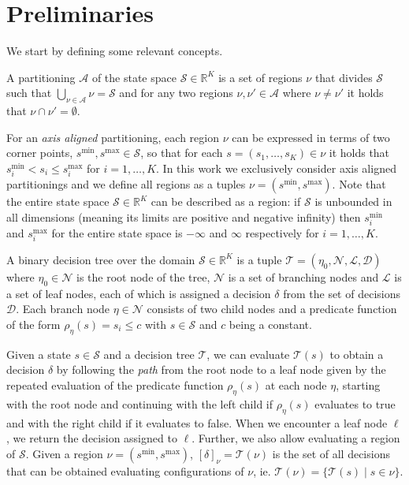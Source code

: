 \section{Preliminaries}%
\label{sec:preliminaries}

We start by defining some relevant concepts.

\begin{definition}[Partitionings]%
\label{def:partitioning}
    A partitioning $\mathcal{A}$ of the state space $\mathcal{S} \in
    \mathbb{R}^K$ is a set of regions $\nu$ that divides $\mathcal{S}$ such that
    $\bigcup_{\nu \in \mathcal{A}}\nu = \mathcal{S}$ and for any two regions
    $\nu, \nu' \in \mathcal{A}$ where $\nu \neq \nu'$ it holds that $\nu \cap
    \nu' = \emptyset$.
\end{definition}

\noindent
For an \textit{axis aligned} partitioning, each region $\nu$ can be expressed in
terms of two corner points, $s^{\min}, s^{\max} \in \mathcal{S}$, so that for
each $s = (s_1, \ldots, s_K) \in \nu$ it holds that $s^{\min}_i < s_i \le
s^{\max}_i$ for $i = 1,\ldots,K$. In this work we exclusively consider axis
aligned partitionings and we define all regions as a tuples $\nu = (s^{\min},
s^{\max})$. Note that the entire state space $\mathcal{S} \in \mathbb{R}^K$ can
be described as a region: if $\mathcal{S}$ is unbounded in all dimensions
(meaning its limits are positive and negative infinity) then $s^{\min}_i$ and
$s^{\max}_i$ for the entire state space is $-\infty$ and $\infty$ respectively
for $i = 1,\ldots,K$.


\begin{definition}%
\label{def:decisionTree}
    A binary decision tree over the domain $\mathcal{S} \in \mathbb{R}^K$ is a
    tuple $\mathcal{T} = (\eta_{0}, \mathcal{N}, \mathcal{L}, \mathcal{D})$
    where $\eta_{0} \in \mathcal{N}$ is the root node of the tree, $\mathcal{N}$
    is a set of branching nodes and $\mathcal{L}$ is a set of leaf nodes, each
    of which is assigned a decision $\delta$ from the set of decisions
    $\mathcal{D}$. Each branch node $\eta \in \mathcal{N}$ consists of two child
    nodes and a predicate function of the form $\rho_{\eta}(s) = s_{i} \leq c$ with $s
    \in \mathcal{S}$ and $c$ being a constant.
\end{definition}

\noindent
Given a state $s \in \mathcal{S}$ and a decision tree $\mathcal{T}$, we can
evaluate $\mathcal{T}(s)$ to obtain a decision $\delta$ by following the
\textit{path} from the root node to a leaf node given by the repeated evaluation
of the predicate function $\rho_{\eta}(s)$ at each node $\eta$, starting with
the root node and continuing with the left child if $\rho_{\eta}(s)$ evaluates
to true and with the right child if it evaluates to false. When we encounter a
leaf node $\ell$, we return the decision assigned to $\ell$. Further, we also
allow evaluating a region of $\mathcal{S}$.  Given a region $\nu = (s^{\min},
s^{\max})$, $[\delta]_{\nu} = \mathcal{T}(\nu)$ is the set of all decisions that
can be obtained evaluating configurations of $\nu$, ie. $\mathcal{T}(\nu) = \{
\mathcal{T}(s) \mid s \in \nu \}$.

